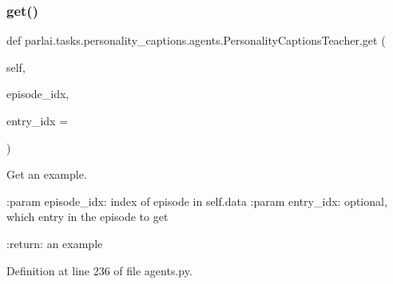 \subsubsection{\texorpdfstring{get()}{get()}}
{\footnotesize\ttfamily def parlai.\+tasks.\+personality\+\_\+captions.\+agents.\+Personality\+Captions\+Teacher.\+get (\begin{DoxyParamCaption}\item[{}]{self,  }\item[{}]{episode\+\_\+idx,  }\item[{}]{entry\+\_\+idx = {} }\end{DoxyParamCaption})}

\begin{DoxyVerb}Get an example.

:param episode_idx:
    index of episode in self.data
:param entry_idx:
    optional, which entry in the episode to get

:return:
    an example
\end{DoxyVerb}
 

Definition at line 236 of file agents.\+py.


